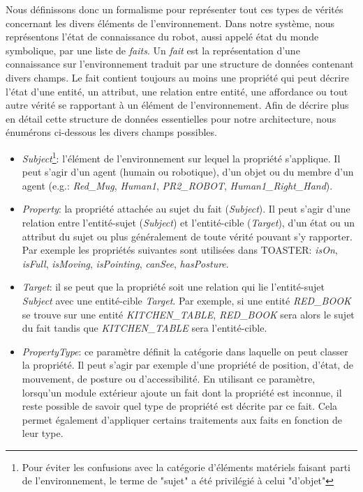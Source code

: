 \documentclass[a4paper,11pt,twoside]{StyleThese}
\begin{document}
Nous définissons donc un formalisme pour représenter tout ces types de vérités concernant les divers éléments de l'environnement.
Dans notre système, nous représentons l'état de connaissance du robot, aussi appelé état du monde symbolique, par une liste de \textit{faits}. Un \textit{fait} est la représentation d'une connaissance sur l'environnement traduit par une structure de données contenant divers champs. Le fait contient toujours au moins une propriété qui peut décrire l'état d'une entité, un attribut, une relation entre entité, une affordance ou tout autre vérité se rapportant à un élément de l'environnement.
Afin de décrire plus en détail cette structure de données essentielles pour notre architecture, nous énumérons ci-dessous les divers champs possibles. 

\begin{itemize}
\item \textit{Subject}\footnote{Pour éviter les confusions avec la catégorie d'éléments matériels faisant parti de l'environnement, le terme de "sujet" a été privilégié à celui "d'objet"}: l'élément de l'environnement sur lequel la propriété s'applique. Il peut s'agir d'un agent (humain ou robotique), d'un objet ou du membre d'un agent (e.g.: \textit{Red\_Mug}, \textit{Human1}, \textit{PR2\_ROBOT}, \textit{Human1\_Right\_Hand}).
\item \textit{Property}: la propriété attachée au sujet du fait (\textit{Subject}). Il peut s'agir d'une relation entre l'entité-sujet (\textit{Subject}) et l'entité-cible (\textit{Target}), d'un état ou un attribut du sujet ou plus généralement de toute vérité pouvant s'y rapporter.  Par exemple les propriétés suivantes sont utilisées dans TOASTER: \textit{isOn}, \textit{isFull}, \textit{isMoving}, \textit{isPointing}, \textit{canSee}, \textit{hasPosture}.
\item \textit{Target}: il se peut que la propriété soit une relation qui lie l'entité-sujet \textit{Subject} avec une entité-cible \textit{Target}. Par exemple, si une entité \textit{RED\_BOOK} se trouve sur une entité \textit{KITCHEN\_TABLE}, \textit{RED\_BOOK} sera alors le sujet du fait tandis que \textit{KITCHEN\_TABLE} sera l'entité-cible.
\item \textit{PropertyType}: ce paramètre définit la catégorie dans laquelle on peut classer la propriété. Il peut s'agir par exemple d'une propriété de position, d'état, de mouvement, de posture ou d'accessibilité. En utilisant ce paramètre, lorsqu'un module extérieur ajoute un fait dont la propriété est inconnue, il reste possible de savoir quel type de propriété est décrite par ce fait. Cela permet également d'appliquer certains traitements aux faits en fonction de leur type.

\end{itemize}
\end{document}
